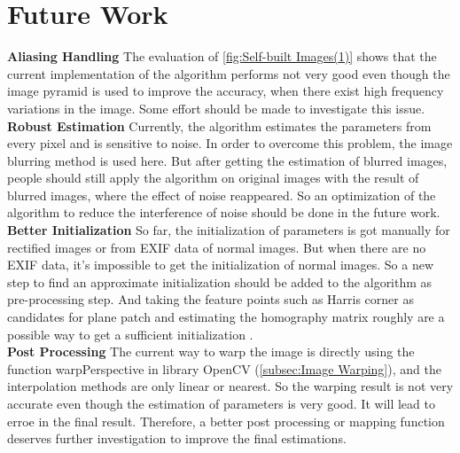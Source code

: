 \section{Future Work}

\textbf{Aliasing Handling} The evaluation of \cref{fig:Self-built Images(1)} shows that the current implementation of the algorithm performs not very good even though the image pyramid is used to improve the accuracy, when there exist high frequency variations in the image. Some effort should be made to investigate this issue.
\\

\textbf{Robust Estimation} Currently, the algorithm estimates the parameters from every pixel and is sensitive to noise. In order to overcome this problem, the image blurring method is used here. But after getting the estimation of blurred images, people should still apply the algorithm on original images with the result of blurred images, where the effect of noise reappeared. So an optimization of the algorithm to reduce the interference of noise should be done in the future work.
\\

\textbf{Better Initialization} So far, the initialization of parameters is got manually for rectified images or from EXIF data of normal images. But when there are no EXIF data, it's impossible to get the initialization of normal images. So a new step to find an approximate initialization should be added to the algorithm as pre-processing step. And taking the feature points such as Harris corner as candidates for plane patch and estimating the homography matrix roughly are a possible way to get a sufficient initialization .
\\

\textbf{Post Processing} The current way to warp the image is directly using the function warpPerspective in library OpenCV (\cref{subsec:Image Warping}), and the interpolation methods are only linear or nearest. So the warping result is not very accurate even though the estimation of parameters is very good. It will lead to erroe in the final result. Therefore, a better post processing or mapping function deserves further investigation to improve the final estimations.














